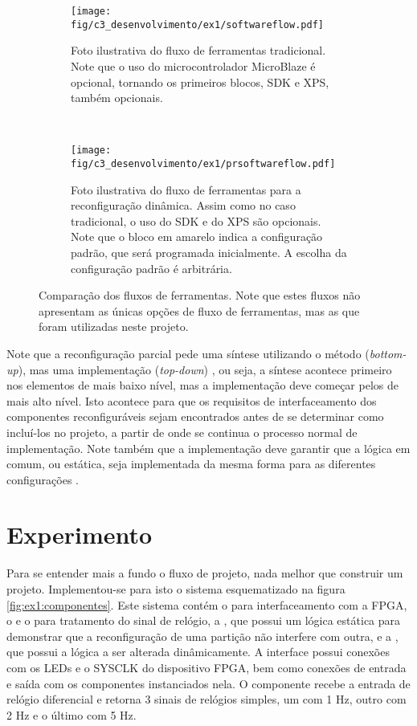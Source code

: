 \documentclass[11pt,a4paper,oneside]{book}
\begin{document}
\begin{figure}[h]
	\centering
       	\begin{subfigure}[b]{\textwidth}
       		\centering
		\texttt{[image: fig/c3\_desenvolvimento/ex1/softwareflow.pdf]}
		\caption{Foto ilustrativa do fluxo de ferramentas tradicional. Note que o uso do microcontrolador MicroBlaze é opcional, tornando os primeiros blocos, SDK e XPS, também opcionais.}
		\label{fig:ex1:softwareflow}
	\end{subfigure}\\
	\begin{subfigure}[b]{\textwidth}
		\centering
		\texttt{[image: fig/c3\_desenvolvimento/ex1/prsoftwareflow.pdf]}
		\caption{Foto ilustrativa do fluxo de ferramentas para a reconfiguração dinâmica. Assim como no caso tradicional, o uso do SDK e do XPS são opcionais. Note que o bloco em amarelo indica a configuração padrão, que será programada inicialmente. A escolha da configuração padrão é arbitrária.}
		\label{fig:ex1:prsoftwareflow}
	\end{subfigure}
	\caption{Comparação dos fluxos de ferramentas. Note que estes fluxos não apresentam as únicas opções de fluxo de ferramentas, mas as que foram utilizadas neste projeto.}
	\label{fig:ex1:softwareflow:comparacao}
\end{figure}

Note que a reconfiguração parcial pede uma síntese utilizando o método  (\textit{bottom-up}), mas uma implementação  (\textit{top-down}) \cite{ug743}, ou seja, a síntese acontece primeiro nos elementos de mais baixo nível, mas a implementação deve começar pelos de mais alto nível.
Isto acontece para que os requisitos de interfaceamento dos componentes reconfiguráveis sejam encontrados antes de se determinar como incluí-los no projeto, a partir de onde se continua o processo normal de implementação.
Note também que a implementação deve garantir que a lógica em comum, ou estática, seja implementada da mesma forma para as diferentes configurações \cite{ug702}.

\section{Experimento}
Para se entender mais a fundo o fluxo de projeto, nada melhor que construir um projeto.
Implementou-se para isto o sistema esquematizado na figura \ref{fig:ex1:componentes}.
Este sistema contém o  para interfaceamento com a FPGA, o  e o  para tratamento do sinal de relógio, a , que possui um lógica estática para demonstrar que a reconfiguração de uma partição não interfere com outra, e a , que possui a lógica a ser alterada dinâmicamente.
A interface  possui conexões com os LEDs e o SYSCLK do dispositivo FPGA, bem como conexões de entrada e saída com os componentes instanciados nela.
O componente  recebe a entrada de relógio diferencial e retorna 3 sinais de relógios simples, um com 1 Hz, outro com 2 Hz e o último com 5 Hz.
\end{document}
